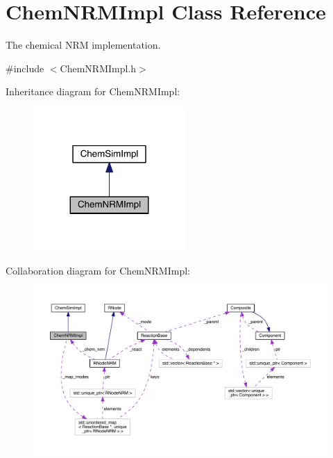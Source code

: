 \hypertarget{classChemNRMImpl}{\section{Chem\+N\+R\+M\+Impl Class Reference}
\label{classChemNRMImpl}
}


The chemical N\+R\+M implementation.  




{\ttfamily \#include $<$Chem\+N\+R\+M\+Impl.\+h$>$}



Inheritance diagram for Chem\+N\+R\+M\+Impl\+:\nopagebreak
\begin{figure}[H]
\begin{center}
\leavevmode
\includegraphics[width=164pt]{classChemNRMImpl__inherit__graph}
\end{center}
\end{figure}


Collaboration diagram for Chem\+N\+R\+M\+Impl\+:
\nopagebreak
\begin{figure}[H]
\begin{center}
\leavevmode
\includegraphics[width=350pt]{classChemNRMImpl__coll__graph}
\end{center}
\end{figure}

